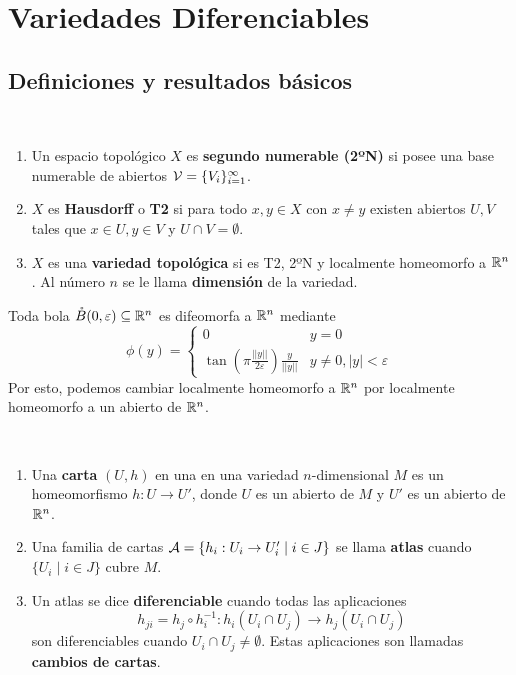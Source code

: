 \documentclass[CV.tex]{subfiles}
\begin{document}

\chapter{Variedades Diferenciables}

\section{Definiciones y resultados básicos}
\begin{defi}\
\begin{enumerate}
\item Un espacio topológico $X$ es \textbf{segundo numerable (2ºN)} si posee una base numerable de abiertos $\mathcal{V}=\{V_i\}_{i=1}^{\infty}$. 
\item $X$ es \textbf{Hausdorff} o \textbf{T2} si para todo $x,y\in X$ con $x\neq y$ existen abiertos $U,V$ tales que $x\in U, y\in V$ y $U\cap V=\emptyset$.
\item $X$ es una \textbf{variedad topológica} si es T2, 2ºN y localmente homeomorfo a $\mathbb{R}^n$. Al número $n$ se le llama \textbf{dimensión} de la variedad. 
\end{enumerate}
\end{defi}

\begin{nota}\label{nota}
Toda bola $\mathring{B}(0,\varepsilon)\subseteq\mathbb{R}^n$ es difeomorfa a $\mathbb{R}^n$ mediante
\[
\phi(y)=\begin{cases}
0 & y=0\\
\tan\left(\pi\frac{||y||}{2\varepsilon}\right)\frac{y}{||y||} & y\neq 0, |y|<\varepsilon
\end{cases}
\]
Por esto, podemos cambiar localmente homeomorfo a $\mathbb{R}^n$ por localmente homeomorfo a un abierto de $\mathbb{R}^n$.
\end{nota}

\begin{defi}\
\begin{enumerate}
\item Una \textbf{carta} $(U,h)$ en una en una variedad $n$-dimensional $M$ es un homeomorfismo $h:U\to U'$, donde $U$ es un abierto de $M$ y $U'$ es un abierto de $\mathbb{R}^n$.
\item Una familia de cartas $\mathcal{A}=\{h_i:U_i\to U_i'\mid i\in J\}$ se llama \textbf{atlas} cuando $\{U_i\mid i\in J\}$ cubre $M$.
\item Un atlas se dice \textbf{diferenciable} cuando todas las aplicaciones
\[
h_{ji}=h_j\circ h_i^{-1}: h_i(U_i\cap U_j)\to h_j(U_i\cap U_j)
\]
son diferenciables cuando $U_i\cap U_j\neq\emptyset$. Estas aplicaciones son llamadas \textbf{cambios de cartas}. 
\end{enumerate}
\end{defi}
\end{document}
